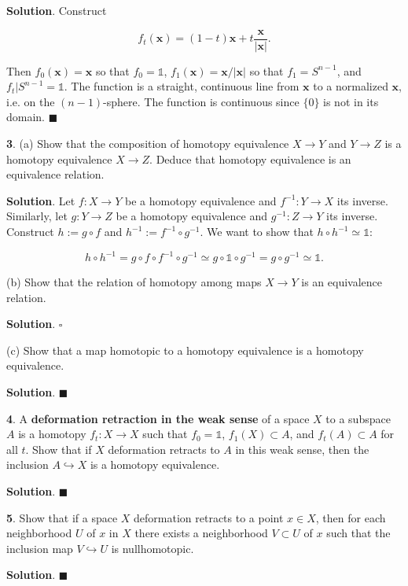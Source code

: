 \documentclass{article}
\newcommand{\identity}{\mathds{1}}
\begin{document}
\textbf{Solution}. Construct

$$f_{t}(\mathbf{x}) = (1-t)\mathbf{x} + t\frac{\mathbf{x}}{|\mathbf{x}|}.$$

Then $f_{0}(\mathbf{x}) = \mathbf{x}$ so that $f_{0} = \identity$, $f_{1}(\mathbf{x}) = \mathbf{x}/|\mathbf{x}|$ so that $f_{1} = S^{n-1}$, and $f_{t}|S^{n-1} = \identity$. The function is a straight, continuous line from $\mathbf{x}$ to a normalized $\mathbf{x}$, i.e. on the $(n-1)$-sphere. The function is continuous since $\{0\}$ is not in its domain. $\blacksquare$
\bigskip
\bigskip

\textbf{3}. (a) Show that the composition of homotopy equivalence $X\to Y$ and $Y\to Z$ is a homotopy equivalence $X\to Z$. Deduce that homotopy equivalence is an equivalence relation.
\medskip

\textbf{Solution}. Let $f:X\to Y$ be a homotopy equivalence and $f^{-1}:Y\to X$ its inverse. Similarly, let $g:Y\to Z$ be a homotopy equivalence and $g^{-1}:Z\to Y$ its inverse. Construct $h := g\circ f$ and $h^{-1} := f^{-1}\circ g^{-1}$. We want to show that $h\circ h^{-1}\simeq \identity$:

$$h\circ h^{-1} = g\circ f\circ f^{-1}\circ g^{-1}\simeq g\circ \identity\circ g^{-1} = g\circ g^{-1}\simeq \identity.$$

(b) Show that the relation of homotopy among maps $X\to Y$ is an equivalence relation.
\medskip

\textbf{Solution}. $\square$
\medskip

(c) Show that a map homotopic to a homotopy equivalence is a homotopy equivalence.
\medskip

\textbf{Solution}. $\blacksquare$
\bigskip
\bigskip

\textbf{4}. A \textbf{deformation retraction in the weak sense} of a space $X$ to a subspace $A$ is a homotopy $f_{t}: X\to X$ such that $f_{0} = \identity$, $f_{1}(X)\subset A$, and $f_{t}(A)\subset A$ for all $t$. Show that if $X$ deformation retracts to $A$ in this weak sense, then the inclusion $A\hookrightarrow X$ is a homotopy equivalence.
\medskip

\textbf{Solution}. $\blacksquare$
\bigskip
\bigskip

\textbf{5}. Show that if a space $X$ deformation retracts to a point $x\in X$, then for each neighborhood $U$ of $x$ in $X$ there exists a neighborhood $V\subset U$ of $x$ such that the inclusion map $V\hookrightarrow U$ is nullhomotopic.
\medskip

\textbf{Solution}. $\blacksquare$
\newpage
\end{document}

